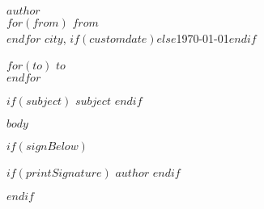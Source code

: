 \documentclass[$fontsize$, a4paper, $lang$]{article}
\newlength{\addresswidth}
\begin{document}
\small


\begin{FlushRight}
  \begin{minipage}{\addresswidth}
    $author$\\
    $for(from)$
      $from$\\
    $endfor$
    \vspace{0.1cm}$city$, $if(customdate)$$else$\today$endif$
  \end{minipage}
\end{FlushRight}


\vspace{1em}

\normalsize \sffamily
$for(to)$
$to$\\
$endfor$

\vspace{3em}

$if(subject)$
\textbf{$subject$}
$endif$

\vspace{1em}

$body$

$if(signBelow)$
\begin{FlushRight}
  $if(printSignature)$
    $author$
  $endif$
\end{FlushRight}

$endif$
\end{document}
